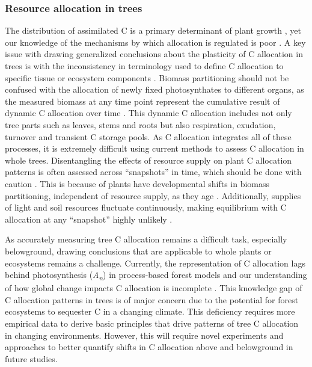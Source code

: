 \documentclass[a4paper]{article}\usepackage[]{graphicx}\usepackage[]{color}
\begin{document}
\subsubsection*{Resource allocation in trees}
The distribution of assimilated C is a primary determinant of plant growth \citep{friedlingstein1999toward}, yet our knowledge of the mechanisms by which allocation is regulated is poor \citep{poorter2012biomass}. A key issue with drawing generalized conclusions about the plasticity of C allocation in trees is with the inconsistency in terminology used to define C allocation to specific tissue or ecosystem components \citep{litton2007carbon}. Biomass partitioning should not be confused with the allocation of newly fixed photosynthates to different organs, as the measured biomass at any time point represent the cumulative result of dynamic C allocation over time \citep{poorter2015does}. This dynamic C allocation includes not only tree parts such as leaves, stems and roots but also respiration, exudation, turnover and transient C storage pools. As C allocation integrates all of these processes, it is extremely difficult using current methods to assess C allocation in whole trees. Disentangling the effects of resource supply on plant C allocation patterns is often assessed across “snapshots” in time, which should be done with caution \citep{reich2002root}. This is because of plants have developmental shifts in biomass partitioning, independent of resource supply, as they age \citep{muller2000effect, poorter2015does}. Additionally, supplies of light and soil resources fluctuate continuously, making equilibrium with C allocation at any “snapshot” highly unlikely \citep{shipley2002balanced}.

As accurately measuring tree C allocation remains a difficult task, especially belowground, drawing conclusions that are applicable to whole plants or ecosystems remains a challenge. Currently, the representation of C allocation lags behind photosynthesis (\textit{A\textsubscript{n}}) in process-based forest models \citep{friedlingstein1999toward, franklin2012modeling, iversen2014terrestrial} and our understanding of how global change impacts C allocation is incomplete \citep{litton2007carbon, warren2012timing}. This knowledge gap of C allocation patterns in trees is of major concern due to the potential for forest ecosystems to sequester C in a changing climate. This deficiency requires more empirical data to derive basic principles that drive patterns of tree C allocation in changing environments. However, this will require novel experiments and approaches to better quantify shifts in C allocation above and belowground in future studies. 
\end{document}
